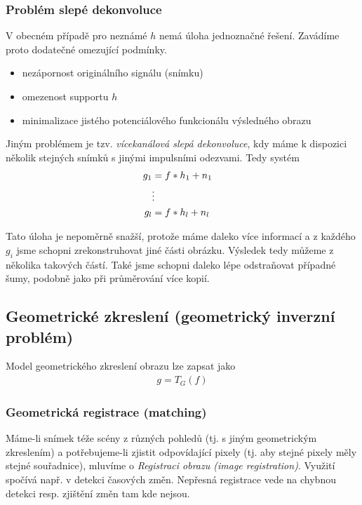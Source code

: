 \subsubsection{Problém slepé dekonvoluce}
V obecném případě pro neznámé $h$ nemá úloha jednoznačné řešení. Zavádíme proto dodatečné omezující podmínky.

\begin{itemize}
\item nezápornost originálního signálu (snímku)
\item omezenost supportu $h$
\item minimalizace jistého potenciálového funkcionálu výsledného obrazu
\end{itemize}

Jiným problémem je tzv. \emph{vícekanálová slepá dekonvoluce}, kdy máme k dispozici několik stejných snímků s jinými
impulsními odezvami. Tedy systém
\begin{align}
g_1 &= f\ast h_1+n_1\\
&\vdots&\nonumber\\
g_l &= f\ast h_l+n_l
\end{align}

Tato úloha je nepoměrně snažší, protože máme daleko více informací a z každého $g_i$ jsme schopni zrekonstruhovat 
jiné části obrázku. Výsledek tedy můžeme  z několika takových částí. Také jsme schopni daleko lépe 
odstraňovat případné šumy, podobně jako při průměrování více kopií.

\subsection{Geometrické zkreslení (geometrický inverzní problém)}
Model geometrického zkreslení obrazu lze zapsat jako
\begin{align}
g=T_G(f)
\end{align}

\subsubsection{Geometrická registrace (matching)}

Máme-li snímek téže scény z různých pohledů (tj. s jiným geometrickým zkreslením) a potřebujeme-li zjistit odpovídající
pixely (tj. aby stejné pixely měly stejné souřadnice), mluvíme o \emph{Registraci obrazu (image registration)}. Využití
spočívá např. v detekci časových změn. Nepřesná registrace vede na chybnou detekci resp. zjištění změn tam kde nejsou.

